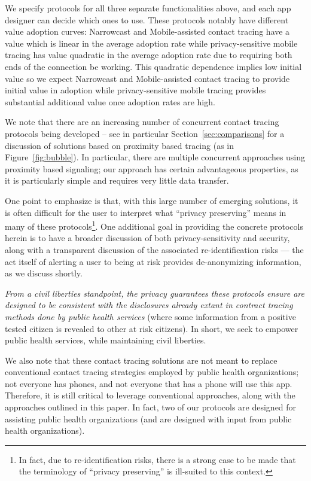  We specify protocols for all three separate functionalities above, and each app designer can decide which ones to use.  These protocols notably have different value adoption curves: Narrowcast and Mobile-assisted contact tracing have a value which is linear in the average adoption rate while privacy-sensitive mobile tracing has value quadratic in the average adoption rate due to requiring both ends of the connection be working.  This quadratic dependence implies low initial value so we expect  Narrowcast and Mobile-assisted contact tracing to provide initial value in adoption while privacy-sensitive mobile tracing provides substantial additional value once adoption rates are high.
 
 We note that there are an increasing number of concurrent contact tracing protocols being developed -- see in particular Section~\ref{sec:comparisons} for a discussion of solutions based on proximity based tracing (as in Figure~\ref{fig:bubble}).  In particular, there are multiple concurrent approaches using proximity based signaling; our approach has certain advantageous properties, as it is particularly simple and requires very little data transfer.
 
One point to emphasize is that, with this large number of emerging solutions, it is often difficult for the user to interpret what ``privacy preserving'' means in many of these protocols\footnote{In fact, due to re-identification risks, there is a strong case to be made that the terminology of ``privacy preserving'' is ill-suited to this context.}. One additional goal in providing the concrete protocols herein is to  have a broader discussion of both privacy-sensitivity and security, along with a transparent discussion of the associated re-identification risks ---  the act itself of alerting a user to being at risk provides de-anonymizing information, as we discuss shortly.  

 
 \emph{From a civil liberties standpoint, the privacy guarantees these protocols ensure are designed to be consistent with the disclosures already extant in contract tracing methods done by public health services} (where some information from a positive tested citizen is revealed to other at risk citizens). In short, we seek to empower public health services, while maintaining civil liberties.
 
We also note that these contact tracing solutions are not meant to replace conventional contact tracing strategies employed by public health organizations; not everyone has phones, and not everyone that has a phone will use this app. Therefore, it is still critical to leverage conventional approaches, along with the approaches outlined in this paper. In fact, two of our protocols are designed for assisting public health organizations (and are designed with input from public health organizations).




